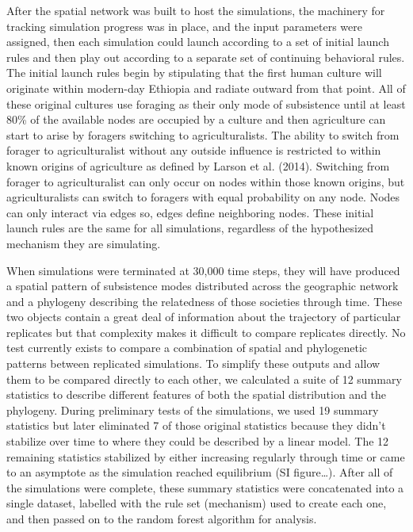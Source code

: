 \documentclass[]{book}
\theoremstyle{definition}
\theoremstyle{definition}
\theoremstyle{definition}
\theoremstyle{remark}
\begin{document}
After the spatial network was built to host the simulations, the
machinery for tracking simulation progress was in place, and the input
parameters were assigned, then each simulation could launch according to
a set of initial launch rules and then play out according to a separate
set of continuing behavioral rules. The initial launch rules begin by
stipulating that the first human culture will originate within
modern-day Ethiopia and radiate outward from that point. All of these
original cultures use foraging as their only mode of subsistence until
at least 80\% of the available nodes are occupied by a culture and then
agriculture can start to arise by foragers switching to
agriculturalists. The ability to switch from forager to agriculturalist
without any outside influence is restricted to within known origins of
agriculture as defined by Larson et al. (2014). Switching from forager
to agriculturalist can only occur on nodes within those known origins,
but agriculturalists can switch to foragers with equal probability on
any node. Nodes can only interact via edges so, edges define neighboring
nodes. These initial launch rules are the same for all simulations,
regardless of the hypothesized mechanism they are simulating.

When simulations were terminated at 30,000 time steps, they will have
produced a spatial pattern of subsistence modes distributed across the
geographic network and a phylogeny describing the relatedness of those
societies through time. These two objects contain a great deal of
information about the trajectory of particular replicates but that
complexity makes it difficult to compare replicates directly. No test
currently exists to compare a combination of spatial and phylogenetic
patterns between replicated simulations. To simplify these outputs and
allow them to be compared directly to each other, we calculated a suite
of 12 summary statistics to describe different features of both the
spatial distribution and the phylogeny. During preliminary tests of the
simulations, we used 19 summary statistics but later eliminated 7 of
those original statistics because they didn't stabilize over time to
where they could be described by a linear model. The 12 remaining
statistics stabilized by either increasing regularly through time or
came to an asymptote as the simulation reached equilibrium (SI
figure\ldots{}). After all of the simulations were complete, these
summary statistics were concatenated into a single dataset, labelled
with the rule set (mechanism) used to create each one, and then passed
on to the random forest algorithm for analysis.
\end{document}
